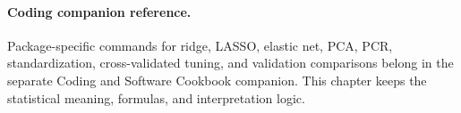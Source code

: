 \paragraph{Coding companion reference.}
Package-specific commands for ridge, LASSO, elastic net, PCA, PCR, standardization, cross-validated tuning, and validation comparisons belong in the separate Coding and Software Cookbook companion.  This chapter keeps the statistical meaning, formulas, and interpretation logic.
